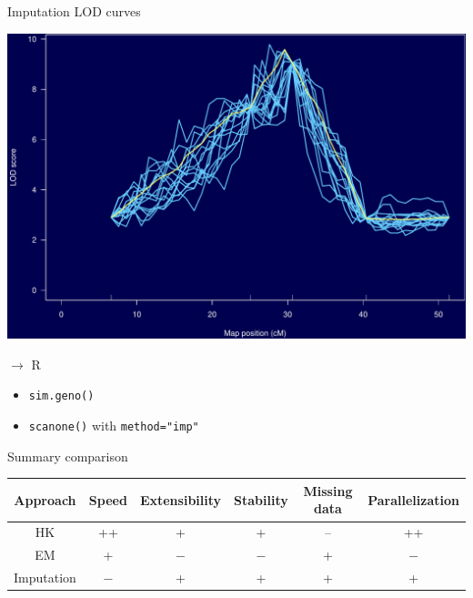 \documentclass[12pt]{article}
\newcommand{\headsize}{\fontsize{35}{35} \selectfont}
\newcommand{\smallsize}{\fontsize{25}{30} \selectfont}
\newcommand{\smallersize}{\fontsize{20}{25} \selectfont}
\begin{document}
\newpage

\headsize \color{myyellow}
\hfill \begin{minipage}{5.75in}
\centering
Imputation LOD curves
\end{minipage}

\vfill

\centerline{\includegraphics{FigsA/imp_lod.pdf}}




\newpage

\headsize \color{myyellow}
$\boldsymbol{\rightarrow}$ R

\vspace{3cm}

\color{mywhite} \smallsize

\hfill \begin{minipage}[t]{9.5in}
\begin{itemize}
\itemsep24pt
\item \verb|sim.geno()|
\item \verb|scanone()| with \verb|method="imp"|
\end{itemize} \end{minipage}




\newpage

\headsize \color{myyellow}
\hfill \begin{minipage}{5.75in}
\centering
Summary comparison
\end{minipage}


\vspace{25mm}

\begin{center}
\color{mywhite}
\smallersize

\renewcommand\arraystretch{2}
\begin{tabular}{cccccc}
\hline
Approach & Speed & Extensibility & Stability & Missing data &
Parallelization \\
\hline
HK & ++ & + & + & -- & ++ \\
EM & + & $-$ & $-$ & + & $-$ \\
Imputation & $-$ & + & + & + & + \\
\hline
\end{tabular}
\end{center}
\end{document}
